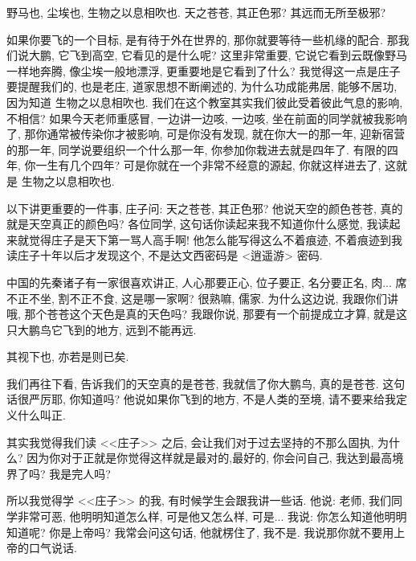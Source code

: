 \documentclass[11pt]{article}
\begin{document}
\begin{center}
	{\color{magenta} 野马也, 尘埃也, 生物之以息相吹也. 天之苍苍, 其正色邪? 其远而无所至极邪?}
\end{center}

\vspace{-0.5cm}

如果你要飞的一个目标, 是有待于外在世界的, 那你就要等待一些机缘的配合. 那我们说大鹏, 它飞到高空, 它看见的是什么呢? 这里非常重要, 它说它看到云既像野马一样地奔腾, 像尘埃一般地漂浮, 更重要地是它看到了什么? 我觉得这一点是庄子要提醒我们的, 也是老庄, 道家思想不断阐述的, 为什么功成能弗居, 能够不居功, 因为知道{\color{blue} 生物之以息相吹也.} 我们在这个教室其实我们彼此受着彼此气息的影响, 不相信? 如果今天老师重感冒, 一边讲一边咳, 一边咳, 坐在前面的同学就被我影响了, 那你通常被传染你才被影响, 可是你没有发现, 就在你大一的那一年, 迎新宿营的那一年, 同学说要组织一个什么那一年, 你参加你栽进去就是四年了. 有限的四年, 你一生有几个四年? 可是你就在一个非常不经意的源起, 你就这样进去了, 这就是{\color{blue} 生物之以息相吹也.}

以下讲更重要的一件事, 庄子问:{\color{blue} 天之苍苍, 其正色邪?}  他说天空的颜色苍苍, 真的就是天空真正的颜色吗? 各位同学, 这句话你读起来我不知道你什么感觉, 我读起来就觉得庄子是天下第一骂人高手啊! 他怎么能写得这么不着痕迹, 不着痕迹到我读庄子十年以后才发现这个, 不是达文西密码是 <逍遥游> 密码. 

中国的先秦诸子有一家很喜欢讲正, 人心那要正心, 位子要正, 名分要正名, 肉... 席不正不坐, 割不正不食, 这是哪一家啊? 很熟嘛, 儒家. 为什么这边说, 我跟你们讲哦, 那个苍苍这个天色是真的天色吗? 我跟你说, 那要有一个前提成立才算, 就是这只大鹏鸟它飞到的地方, 远到不能再远.

\begin{center}
	{\color{magenta} 其视下也, 亦若是则已矣.}
\end{center}

\vspace{-0.5cm}

我们再往下看, 告诉我们的天空真的是苍苍, 我就信了你大鹏鸟, 真的是苍苍. 这句话很严厉耶, 你知道吗? 他说如果你飞到的地方, 不是人类的至境, 请不要来给我定义什么叫正.

其实我觉得我们读 <<庄子>> 之后, 会让我们对于过去坚持的不那么固执, 为什么? 因为你对于正就是你觉得这样就是最对的,最好的, 你会问自己, 我达到最高境界了吗? 我是完人吗? 

所以我觉得学 <<庄子>> 的我, 有时候学生会跟我讲一些话. 他说: 老师, 我们同学非常可恶, 他明明知道怎么样, 可是他又怎么样, 可是... 我说: 你怎么知道他明明知道呢? 你是上帝吗? 我常会问这句话, 他就楞住了, 我不是. 我说那你就不要用上帝的口气说话. 
\end{document}

